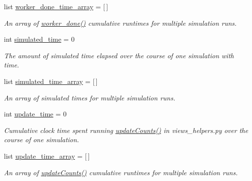 \begin{DoxyCompactItemize}
list \mbox{\hyperlink{classdynamicfilterapp_1_1test__simulations_1_1_simulation_test_afaec525ce73afa412628498ba8603b65}{worker\+\_\+done\+\_\+time\+\_\+array}} = \mbox{[}$\,$\mbox{]}
\begin{DoxyCompactList}\small\item\em An array of \mbox{\hyperlink{namespacedynamicfilterapp_1_1views__helpers_af27860dfe5bfa6b2b8a1b29347eb918d}{worker\+\_\+done()}} cumulative runtimes for multiple simulation runs. \end{DoxyCompactList}\item 
int \mbox{\hyperlink{classdynamicfilterapp_1_1test__simulations_1_1_simulation_test_a6f5fc01b7113c998fcfc7cb55d4d726e}{simulated\+\_\+time}} = 0
\begin{DoxyCompactList}\small\item\em The amount of simulated time elapsed over the course of one simulation with time. \end{DoxyCompactList}\item 
list \mbox{\hyperlink{classdynamicfilterapp_1_1test__simulations_1_1_simulation_test_ab2666a2c03eb51015003354a03c0f25e}{simulated\+\_\+time\+\_\+array}} = \mbox{[}$\,$\mbox{]}
\begin{DoxyCompactList}\small\item\em An array of simulated times for multiple simulation runs. \end{DoxyCompactList}\item 
int \mbox{\hyperlink{classdynamicfilterapp_1_1test__simulations_1_1_simulation_test_ac218a6f58aae0da542fe9887eb8a6c21}{update\+\_\+time}} = 0
\begin{DoxyCompactList}\small\item\em Cumulative clock time spent running \mbox{\hyperlink{namespacedynamicfilterapp_1_1views__helpers_a57d6ebd6f2f99cba59b82eded490891f}{update\+Counts()}} in views\+\_\+helpers.\+py over the course of one simulation. \end{DoxyCompactList}\item 
list \mbox{\hyperlink{classdynamicfilterapp_1_1test__simulations_1_1_simulation_test_ab4055eae9396bd4aed941b202095d298}{update\+\_\+time\+\_\+array}} = \mbox{[}$\,$\mbox{]}
\begin{DoxyCompactList}\small\item\em An array of \mbox{\hyperlink{namespacedynamicfilterapp_1_1views__helpers_a57d6ebd6f2f99cba59b82eded490891f}{update\+Counts()}} cumulative runtimes for multiple simulation runs. \end{DoxyCompactList}\item 

\end{DoxyCompactItemize}
